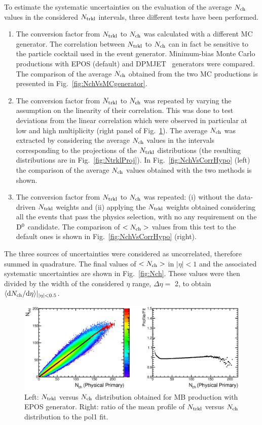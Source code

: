 To estimate the systematic uncertainties on the evaluation of the average 
$N_{\rm ch}$ values in the considered $N_{\rm trkl}$ intervals, three different tests have been performed.
\begin{enumerate}
\item The conversion factor from $N_{\rm trkl}$ to $N_{\rm ch}$ was calculated with a different MC generator. The correlation
between $N_{\rm trkl}$ to $N_{\rm ch}$ can in fact be sensitive to the particle cocktail used in the event generator.
Minimum-bias Monte Carlo 
productions with EPOS (default) and DPMJET~\cite{Ranft:1994fd} generators were compared.
The comparison of the average $N_{\rm ch}$ obtained from the two MC productions
is presented in Fig.~\ref{fig:NchVsMCgenerator}.
\item The conversion factor from $N_{\rm trkl}$ to $N_{\rm ch}$ was repeated by varying the 
assumption on the linearity of their correlation. This was done to test deviations from 
the linear correlation which were observed in particular at low and high multiplicity (right panel of Fig.~\ref{fig:NtrklVsNch}).  
The average $N_{\rm ch}$ was extracted by considering the average 
$N_{\rm ch}$ values in the intervals corresponding to the projections of the $N_{\rm trkl}$ 
distributions (the resulting distributions are in Fig.~\ref{fig:NtrklProj}).
In Fig.~\ref{fig:NchVsCorrHypo} (left) the comparison of the average $N_{\rm ch}$ values
obtained with the two methods is shown.
\item The conversion factor from $N_{\rm trkl}$ to $N_{\rm ch}$ was repeated: (i) without the data-driven 
$N_{\rm trkl}$ weights and (ii) applying the $N_{\rm trkl}$ weights obtained considering all 
the events that pass the physics selection, with no any requirement on the 
${\rm D^0}$ candidate. The comparison of $<N_{\rm ch}>$ values from this test to the default ones 
is shown in Fig.~\ref{fig:NchVsCorrHypo} (right).
\end{enumerate}
The three sources of uncertainties were considered as 
uncorrelated, therefore summed in quadrature. The final values of $<N_{\rm ch}>$ in $|\eta|<1$ 
and the associated systematic uncertainties are shown in 
Fig.~\ref{fig:Nch}. These values were then divided by the 
width of the considered $\eta$ range, $\Delta \eta =$ 2, 
to obtain $\langle {\rm d} N_{\rm ch}/{\rm d}  \eta \rangle |_{|\eta|<0.5}$.\\


\begin{figure}[h]
\centering
 \includegraphics[width=1.\textwidth]{FigCap6/NtrklVsNchPhysPrimWithNtrklsReweight17f2a.eps}
 \caption{Left: $N_{\rm trkl}$ versus $N_{\rm ch}$ distribution obtained for MB production with EPOS generator. Right: ratio of the mean profile of $N_{\rm trkl}$ versus $N_{\rm ch}$ distribution to the pol1 fit.}
 \label{fig:NtrklVsNch}
\end{figure}


